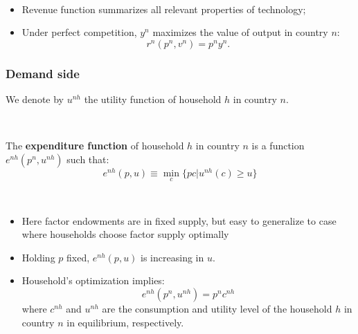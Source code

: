 \begin{note}
    \

    \begin{itemize}
        \item Revenue function summarizes all relevant properties of technology;
        \item Under perfect competition, $y^n$ maximizes the value of output in country $n$:
        \[r^n(p^n, v^n) = p^n y^n.\]
    \end{itemize}
\end{note}

\subsubsection{Demand side}
We denote by $u^{nh}$ the utility function of household $h$ in country $n$.

\begin{definition}
    \label{def:expendfunc}
    \

    The \textbf{expenditure function} of household $h$ in country $n$ is a function $e^{nh}(p^n, u^{nh})$ such that:
    \begin{equation}\label{eq:expendfunc}
        e^{nh}(p, u) \equiv \min_{c} \{pc | u^{nh}(c) \geq u\}
    \end{equation}
\end{definition}

\begin{note}
    \

    \begin{itemize}
        \item Here factor endowments are in fixed supply, but easy to generalize to
        case where households choose factor supply optimally
        \item Holding $p$ fixed, $e^{nh}(p,u) $ is increasing in $u$.
        \item Household's optimization implies:
        \[e^{nh}(p^n, u^{nh}) = p^n c^{nh} \]
        where $c^{nh}$ and $u^{nh}$ are the consumption and utility level of the household $h$ in country $n$ in equilibrium, respectively.
    \end{itemize}
\end{note}


